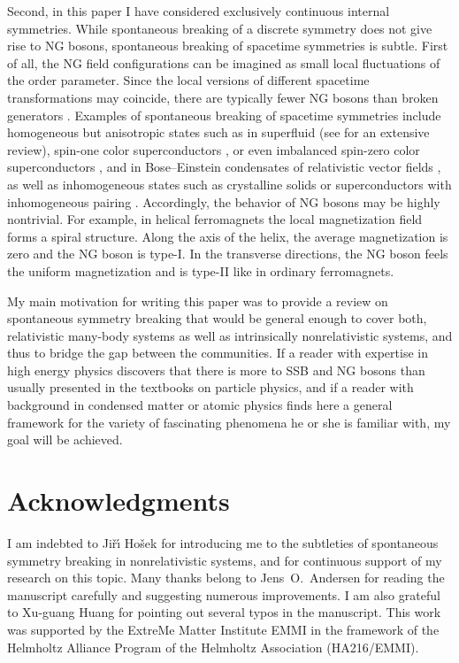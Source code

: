 \documentclass[final,3p,times,12pt,a4paper,sort&compress]{elsarticle}
\begin{document}
Second, in this paper I have considered exclusively continuous internal
symmetries. While spontaneous breaking of a discrete symmetry does not give
rise to NG bosons, spontaneous breaking of spacetime symmetries is subtle.
First of all, the NG field configurations can be imagined as small local
fluctuations of the order parameter. Since the local versions of different
spacetime transformations may coincide, there are typically fewer NG bosons
than broken generators \cite{Low:2001bw}. Examples of spontaneous breaking of
spacetime symmetries include homogeneous but anisotropic states
such as in superfluid  (see \cite{Vollhardt:1990vw} for an
extensive review), spin-one color superconductors \cite{Schmitt:2004et}, or even
imbalanced spin-zero color superconductors \cite{Muther:2002ej}, and in
Bose--Einstein condensates of relativistic vector fields
\cite{Sannino:2001fd,Gusynin:2003yu}, as well as inhomogeneous states such as
crystalline solids \cite{Leutwyler:1996er} or superconductors with inhomogeneous
pairing \cite{Casalbuoni:2003wh}. Accordingly, the behavior of NG bosons may be
highly nontrivial. For example, in helical ferromagnets
\cite{Dzyaloshinsky:1958dz,Moriya:1960mo} the local magnetization field forms a
spiral structure. Along the axis of the helix, the average magnetization is zero
and the NG boson is type-I. In the transverse directions, the NG boson feels the
uniform magnetization and is type-II like in ordinary ferromagnets.

My main motivation for writing this paper was to provide a review on
spontaneous symmetry breaking that would be general enough to cover both,
relativistic many-body systems as well as intrinsically nonrelativistic systems,
and thus to bridge the gap between the communities. If a reader with expertise
in high energy physics discovers that there is more to SSB and NG bosons than
usually presented in the textbooks on particle physics, and if a reader with
background in condensed matter or atomic physics finds here a general framework
for the variety of fascinating phenomena he or she is familiar with, my goal
will be achieved.


\section*{Acknowledgments}
I am indebted to Ji\v{r}\'{\i} Ho\v{s}ek for introducing me to the subtleties
of spontaneous symmetry breaking in nonrelativistic systems, and for continuous
support of my research on this topic. Many thanks belong to Jens~O.~Andersen for
reading the manuscript carefully and suggesting numerous improvements. I am
also grateful to Xu-guang Huang for pointing out several typos in the
manuscript. This work was supported by the ExtreMe Matter Institute EMMI in the
framework of the Helmholtz Alliance Program of the Helmholtz Association
(HA216/EMMI).




\end{document}
